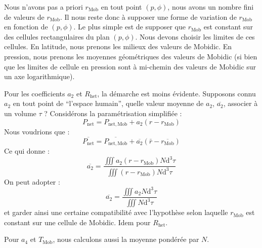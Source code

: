 \documentclass[a4paper,english,french]{article}
\newcommand{\ud}{\mathrm{d}}
\begin{document}
Nous n'avons pas a priori $r_\mathrm{Mob}$ en tout point $(p, \phi)$,
nous avons un nombre fini de valeurs de $r_\mathrm{Mob}$. Il nous
reste donc à supposer une forme de variation de $r_\mathrm{Mob}$ en
fonction de $(p, \phi)$. Le plus simple est de supposer que
$r_\mathrm{Mob}$ est constant sur des cellules rectangulaires du plan
$(p, \phi)$. Nous devons choisir les limites de ces cellules. En
latitude, nous prenons les milieux des valeurs de Mobidic. En
pression, nous prenons les moyennes géométriques des valeurs de
Mobidic (si bien que les limites de cellule en pression sont à
mi-chemin des valeurs de Mobidic sur un axe logarithmique).

Pour les coefficients $a_2$ et $R_\mathrm{het}$, la démarche est moins
évidente. Supposons connu $a_2$ en tout point de ``l'espace humain'',
quelle valeur moyenne de $a_2$, $\overline{a_2}$, associer à un volume
$\tau$ ?  Considérons la paramétrisation simplifiée :
\begin{displaymath}
  P_\mathrm{net} = P_\mathrm{net,Mob} + a_2 (r - r_\mathrm{Mob})
\end{displaymath}
Nous voudrions que :
\begin{displaymath}
  \overline{P_\mathrm{net}}
  = \overline{P_\mathrm{net,Mob}}
  + \overline{a_2} (\bar r - \overline{r_\mathrm{Mob}})
\end{displaymath}
Ce qui donne :
\begin{displaymath}
  \overline{a_2}
  = \frac{\iiint a_2 (r - r_\mathrm{Mob}) N \ud^3 \tau}
  {\iiint (r - r_\mathrm{Mob})N \ud^3 \tau}
\end{displaymath}
On peut adopter :
\begin{displaymath}
  \overline{a_2} = \frac{\iiint a_2 N \ud^3 \tau}{\iiint N \ud^3 \tau}
\end{displaymath}
et garder ainsi une certaine compatibilité avec l'hypothèse selon
laquelle $r_\mathrm{Mob}$ est constant sur une cellule de
Mobidic. Idem pour $R_\mathrm{het}$.

Pour $a_4$ et $T_\mathrm{Mob}$, nous calculons aussi la moyenne
pondérée par $N$.
\end{document}
